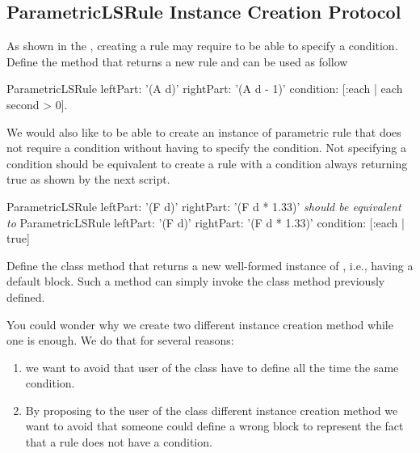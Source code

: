 

\subsection{ParametricLSRule Instance Creation Protocol}

As shown in the , creating a rule may
require to be able to specify a condition. Define the method
 that returns a new rule and can be used
as follow

\begin{scriptwithouttitle}
ParametricLSRule 
   leftPart: '(A d)'
   rightPart: '(A d - 1)'
   condition: [:each | each second > 0].
\end{scriptwithouttitle}

We would also like to be able to create an instance of parametric rule
that does not require a condition without having to specify the
condition. Not specifying a condition should be equivalent to create a rule with a condition always returning true as shown by the next script.


\begin{scriptwithouttitle}
ParametricLSRule
   leftPart: '(F d)'
   rightPart: '(F d * 1.33)'
\emph{should be equivalent to}
ParametricLSRule
   leftPart: '(F d)'
   rightPart: '(F d * 1.33)'
   condition: [:each | true]
\end{scriptwithouttitle}



Define the class method  that returns a new
well-formed instance of , i.e., having a default
block.  Such a method can simply invoke the class method
 previously defined. 

You could wonder why we create two different instance creation method while one is enough. We do that for several reasons:
\begin{enumerate}
\item we want to avoid that user of the class have to  define all the time
the same condition.

\item  By proposing to the user of the class  different instance creation method we want to avoid that someone could define a wrong block to represent the fact that a rule does not have a condition. 
\end{enumerate}

